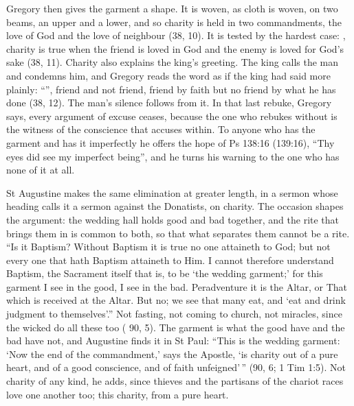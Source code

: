 Gregory then gives the garment a shape. It is woven, as cloth is woven, on two
beams, an upper and a lower, and so charity is held in two commandments, the
love of God and the love of neighbour (38, 10). It is tested by the hardest
case: , charity is true when the friend is loved in God and
the enemy is loved for God's sake (38, 11). Charity also explains the king's
greeting. The king calls the man  and condemns him, and Gregory
reads the word as if the king had said more plainly: ``'', friend and not
friend, friend by faith but no friend by what he has done (38, 12). The man's
silence follows from it. In that last rebuke, Gregory says, every argument of
excuse ceases, because the one who rebukes without is the witness of the
conscience that accuses within. To anyone who has the garment and has it
imperfectly he offers the hope of Ps 138:16 (139:16), ``Thy eyes did see my
imperfect being'', and he turns his warning to the one who has none of it at
all.

St Augustine makes the same elimination at greater length, in a sermon whose
heading calls it a sermon against the Donatists, on charity. The occasion
shapes the argument: the wedding hall holds good and bad together, and the
rite that brings them in is common to both, so that what separates them cannot
be a rite. ``Is it
Baptism? Without Baptism it is true no one attaineth to God; but not every one
that hath Baptism attaineth to Him. I cannot therefore understand Baptism, the
Sacrament itself that is, to be `the wedding garment;' for this garment I see
in the good, I see in the bad. Peradventure it is the Altar, or That which is
received at the Altar. But no; we see that many eat, and `eat and drink
judgment to themselves'.'' Not fasting, not coming to church, not miracles,
since the wicked do all these too ( 90, 5). The garment is what the
good have and the bad have not, and Augustine finds it in St Paul: ``This is
the wedding garment: `Now the end of the commandment,' says the Apostle, `is
charity out of a pure heart, and of a good conscience, and of faith
unfeigned'\,'' (90, 6; 1 Tim 1:5). Not charity of any kind, he adds, since
thieves and the partisans of the chariot races love one another too; this
charity, from a pure heart.

